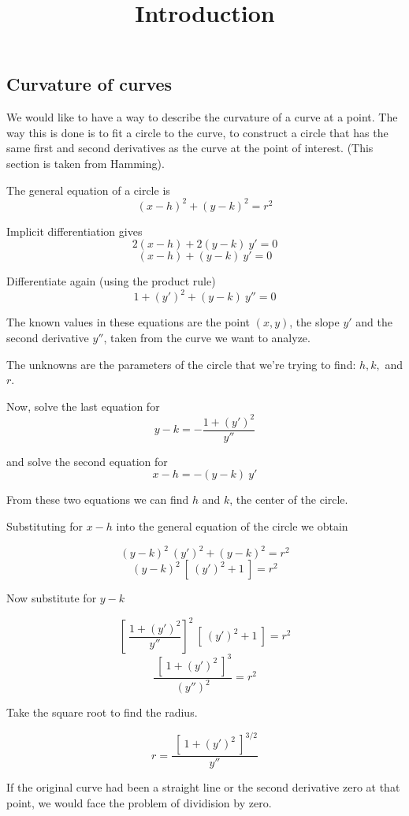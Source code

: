 \documentclass[11pt, oneside]{article}
\title{Introduction}
\date{}
\begin{document}
\maketitle
\Large


\subsection*{Curvature of curves}
We would like to have a way to describe the curvature of a curve at a point.  The way this is done is to fit a circle to the curve, to construct a circle that has the same first and second derivatives as the curve at the point of interest.  (This section is taken from Hamming).

The general equation of a circle is
\[ (x-h)^2 + (y-k)^2 = r^2 \]

Implicit differentiation gives
\[ 2(x - h) + 2(y - k) \ y' = 0 \]
\[ (x - h) + (y - k) \ y' = 0 \]

Differentiate again (using the product rule)
\[ 1 + (y')^2 +  (y - k) \ y''  = 0 \]

The known values in these equations are the point $(x,y)$, the slope $y'$ and the second derivative $y''$, taken from the curve we want to analyze.  

The unknowns are the parameters of the circle that we're trying to find:  $h,k,$ and $r$.  

Now, solve the last equation for 
\[ y - k = - \frac{1 + (y')^2}{y''} \]

and solve the second equation for
\[ x - h = -(y - k)\ y' \]

From these two equations we can find $h$ and $k$, the center of the circle.

Substituting for $x-h$ into the general equation of the circle we obtain

\[ (y - k)^2 \ (y')^2 + (y-k)^2 = r^2 \]
\[ (y-k)^2 \ [ \ (y')^2 + 1 \ ]  = r^2 \]

Now substitute for $y-k$

\[ [ \ \frac{1 + (y')^2}{y''} ]^2 \  [ \ (y')^2 + 1 \ ] = r^2 \]
\[ \frac{\ [ \ 1 + (y')^2 \ ]^3}{(y'')^2} = r^2 \]

Take the square root to find the radius.

\[  r =  \frac{\ [ \ 1 + (y')^2 \ ]^{3/2}}{y''} \]

If the original curve had been a straight line or the second derivative zero at that point, we would face the problem of dividision by zero.  
\end{document}
